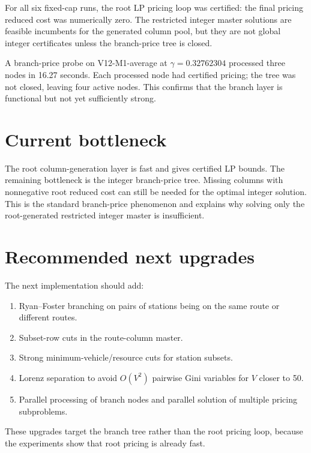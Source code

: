 \documentclass[11pt]{article}
\begin{document}
For all six fixed-cap runs, the root LP pricing loop was certified: the final pricing reduced cost was numerically zero.  The restricted integer master solutions are feasible incumbents for the generated column pool, but they are not global integer certificates unless the branch-price tree is closed.

A branch-price probe on V12-M1-average at $\gamma=0.32762304$ processed three nodes in 16.27 seconds.  Each processed node had certified pricing; the tree was not closed, leaving four active nodes.  This confirms that the branch layer is functional but not yet sufficiently strong.

\section{Current bottleneck}
The root column-generation layer is fast and gives certified LP bounds.  The remaining bottleneck is the integer branch-price tree.  Missing columns with nonnegative root reduced cost can still be needed for the optimal integer solution.  This is the standard branch-price phenomenon and explains why solving only the root-generated restricted integer master is insufficient.

\section{Recommended next upgrades}
The next implementation should add:
\begin{enumerate}
\item Ryan--Foster branching on pairs of stations being on the same route or different routes.
\item Subset-row cuts in the route-column master.
\item Strong minimum-vehicle/resource cuts for station subsets.
\item Lorenz separation to avoid $O(V^2)$ pairwise Gini variables for $V$ closer to 50.
\item Parallel processing of branch nodes and parallel solution of multiple pricing subproblems.
\end{enumerate}
These upgrades target the branch tree rather than the root pricing loop, because the experiments show that root pricing is already fast.
\end{document}
